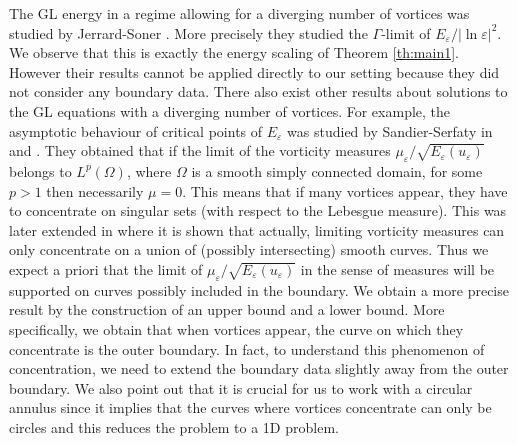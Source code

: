 \documentclass[12pt,reqno]{amsart}
\def\e {{\varepsilon}}
\numberwithin{equation}{section}
\begin{document}
 The GL energy  in a regime allowing for a diverging number of vortices was studied by Jerrard-Soner \cite{Jerrard_Soner_2002}. More precisely they studied the \(\Gamma\)-limit of \(E_\e/|\ln \e|^2\). We observe that this is exactly the energy scaling of Theorem \ref{th:main1}. However their results cannot be applied directly to our setting because they did not consider any boundary data. There also exist  other results about solutions to the GL equations with a diverging number of vortices. For example, the asymptotic behaviour of  critical points of \(E_\e\) was studied by Sandier-Serfaty in \cite{Sandier_Serfaty_2003} and \cite[Chapter 7]{Sandier_Serfaty_2007}. They obtained that if the limit of the vorticity measures \(\mu_\e/\sqrt{E_\e(u_\e)}\) belongs to \(L^p(\Omega)\), where \(\Omega\) is a smooth simply connected domain, for some \(p>1\) then necessarily \(\mu=0\). This means that if many vortices appear, they have to concentrate on singular sets (with respect to the Lebesgue measure). This was later extended in \cite{Rodiac_2016} where it is shown that actually, limiting vorticity measures can only concentrate on a union of (possibly intersecting) smooth curves. Thus we expect a priori that the limit of \(\mu_\e/\sqrt{E_\e(u_\e)}\) in the sense of measures will be supported on curves possibly included in the boundary. We  obtain a more precise result by the construction of an upper bound and a lower bound.  More specifically, we obtain that when vortices appear, the curve on which they concentrate is the outer boundary. In fact, to understand this phenomenon of concentration, we need to extend the boundary data slightly away from the outer boundary. We also point out that it is crucial for us to work with a circular annulus since it implies that the curves where vortices concentrate can only be circles and this reduces the problem to a 1D problem.
\medskip
\end{document}

